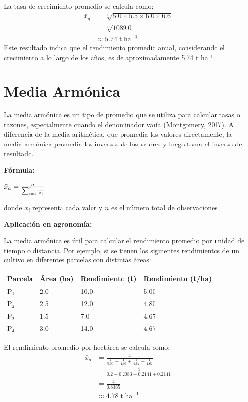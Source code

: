 \documentclass[
  spanish,
  letterpaper,
]{book}
\begin{document}
La tasa de crecimiento promedio se calcula como: \[\begin{aligned}
\bar{x}_g &= \sqrt[4]{5.0 \times 5.5 \times 6.0 \times 6.6} \\[4pt]
          &= \sqrt[4]{1089.0} \\[4pt]
          &\approx 5.74\; \text{t ha}^{-1}
\end{aligned}\] Este resultado indica que el rendimiento promedio anual,
considerando el crecimiento a lo largo de los años, es de
aproximadamente 5.74 t ha⁻¹.

\section{Media Armónica}\label{media-armuxf3nica}

La media armónica es un tipo de promedio que se utiliza para calcular
tasas o razones, especialmente cuando el denominador varía (Montgomery,
2017). A diferencia de la media aritmética, que promedia los valores
directamente, la media armónica promedia los inversos de los valores y
luego toma el inverso del resultado.

\textbf{Fórmula:}

\(\Huge\bar{x}_a = \frac{n}{\sum_{i=1}^{n} \frac{1}{x_i}}\)

donde \(x_i\)\hspace{0pt} representa cada valor y \(n\) es el número
total de observaciones.

\textbf{Aplicación en agronomía:}

La media armónica es útil para calcular el rendimiento promedio por
unidad de tiempo o distancia. Por ejemplo, si se tienen los siguientes
rendimientos de un cultivo en diferentes parcelas con distintas áreas:

\begin{longtable}[]{@{}llll@{}}
\toprule\noalign{}
Parcela & Área (ha) & Rendimiento (t) & Rendimiento (t/ha) \\
\midrule\noalign{}
\endhead
\bottomrule\noalign{}
\endlastfoot
P₁ & 2.0 & 10.0 & 5.00 \\
P₂ & 2.5 & 12.0 & 4.80 \\
P₃ & 1.5 & 7.0 & 4.67 \\
P₄ & 3.0 & 14.0 & 4.67 \\
\end{longtable}

El rendimiento promedio por hectárea se calcula como: \[\begin{aligned}
\bar{x}_a &= \frac{4}{\frac{1}{5.00} + \frac{1}{4.80} + \frac{1}{4.67} + \frac{1}{4.67}} \\[4pt]
          &= \frac{4}{0.2 + 0.2083 + 0.2141 + 0.2141} \\[4pt]
          &= \frac{4}{0.8365} \\[4pt]
          &\approx 4.78\; \text{t ha}^{-1}
\end{aligned}\]
\end{document}
